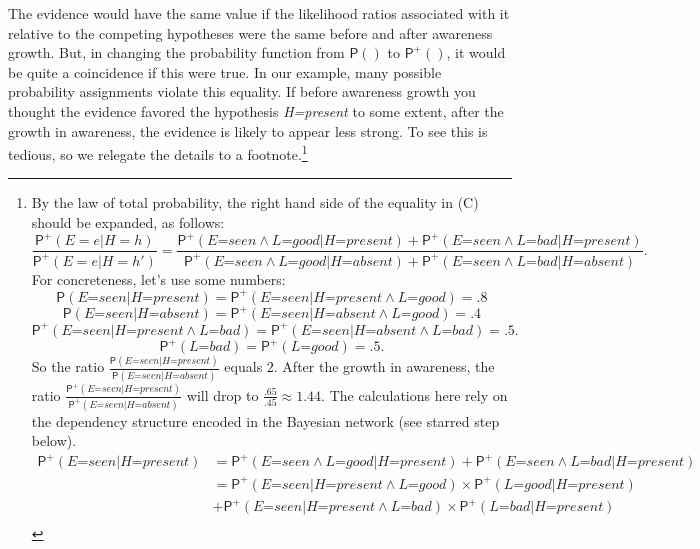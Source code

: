 \documentclass[
  11pt,
  dvipsnames,enabledeprecatedfontcommands]{scrartcl}
\newcommand{\pr}[1]{\ensuremath{\mathsf{P}(#1)}}
\newcommand{\ppr}[2]{\ensuremath{\mathsf{P}^{#1}(#2)}}
\begin{document}
The evidence would have the same value if the likelihood ratios
associated with it relative to the competing hypotheses were the same
before and after awareness growth. But, in changing the probability
function from \(\pr{}\) to \(\ppr{+}{}\), it would be quite a
coincidence if this were true. In our example, many possible probability
assignments violate this equality. If before awareness growth you
thought the evidence favored the hypothesis \textit{H=present} to some
extent, after the growth in awareness, the evidence is likely to appear
less strong. To see this is tedious, so we relegate the details to a
footnote.\footnote{By the law of total probability, the right hand side
  of the equality in (C) should be expanded, as follows:
  \[\frac{\ppr{+}{E=e \vert H=h}}{\ppr{+}{E=e \vert H=h'}}=\frac{\ppr{+}{\textit{E=seen} \wedge \textit{L=good} \vert \textit{H=present}}+\ppr{+}{\textit{E=seen} \wedge \textit{L=bad} \vert \textit{H=present}}}{\ppr{+}{\textit{E=seen} \wedge \textit{L=good} \vert \textit{H=absent}}+\ppr{+}{\textit{E=seen} \wedge \textit{L=bad} \vert \textit{H=absent}}}.\]
  For concreteness, let's use some numbers:
  \[\pr{\textit{E=seen} \vert \textit{H=present}}=\ppr{+}{\textit{E=seen} \vert \textit{H=present} \wedge \textit{L=good}}=.8\]
  \[\pr{\textit{E=seen} \vert \textit{H=absent}}=\ppr{+}{\textit{E=seen} \vert \textit{H=absent} \wedge \textit{L=good}}=.4\]
  \[\ppr{+}{\textit{E=seen} \vert \textit{H=present} \wedge \textit{L=bad}} = \ppr{+}{\textit{E=seen} \vert \textit{H=absent} \wedge \textit{L=bad}}=.5.\]
  \[\ppr{+}{\textit{L=bad}} = \ppr{+}{\textit{L=good}}=.5.\] So the
  ratio
  \(\frac{\pr{\textit{E=seen} \vert \textit{H=present}}}{\pr{\textit{E=seen} \vert \textit{H=absent}}}\)
  equals \(2\). After the growth in awareness, the ratio
  \(\frac{\ppr{+}{\textit{E=seen} \vert \textit{H=present}}}{\ppr{+}{\textit{E=seen} \vert \textit{H=absent}}}\)
  will drop to \(\frac{.65}{.45}\approx 1.44\). The calculations here
  rely on the dependency structure encoded in the Bayesian network (see
  starred step below). \begin{align*}
  \ppr{+}{\textit{E=seen} \vert \textit{H=present}} &= \ppr{+}{\textit{E=seen} \wedge \textit{L=good} \vert \textit{H=present}}+\ppr{+}{\textit{E=seen} \wedge \textit{L=bad} \vert \textit{H=present}}\\
  &= \ppr{+}{\textit{E=seen} \vert \textit{H=present} \wedge \textit{L=good}}  \times \ppr{+}{\textit{L=good} \vert  \textit{H=present} }\\ & +\ppr{+}{\textit{E=seen}  \vert \textit{H=present} \wedge \textit{L=bad}} \times \ppr{+}{\textit{L=bad} \vert  \textit{H=present}}\\

\end{align*}}
\end{document}
